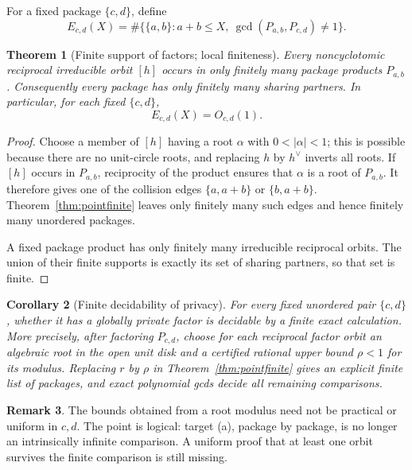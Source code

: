 \documentclass[11pt]{article}
\newtheorem{theorem}{Theorem}[section]
\newtheorem{corollary}[theorem]{Corollary}
\theoremstyle{definition}
\newtheorem{remark}[theorem]{Remark}
\begin{document}
For a fixed package \(\{c,d\}\), define
\[
 E_{c,d}(X)=\#\bigl\{\{a,b\}:a+b\leq X,
 \ \gcd(P_{a,b},P_{c,d})\neq1\bigr\}.
\]

\begin{theorem}[Finite support of factors; local finiteness]
\label{thm:localfinite}
Every noncyclotomic reciprocal irreducible orbit \([h]\) occurs in only
finitely many package products \(P_{a,b}\).  Consequently every package has
only finitely many sharing partners.  In particular, for each fixed
\(\{c,d\}\),
\[
 E_{c,d}(X)=O_{c,d}(1).
\]
\end{theorem}

\begin{proof}
Choose a member of \([h]\) having a root \(\alpha\) with
\(0<|\alpha|<1\); this is possible because there are no unit-circle roots,
and replacing \(h\) by \(h^\vee\) inverts all roots.  If \([h]\) occurs
in \(P_{a,b}\), reciprocity of the product ensures that \(\alpha\) is a
root of \(P_{a,b}\).  It therefore gives one of the collision edges
\(\{a,a+b\}\) or \(\{b,a+b\}\).  Theorem~\ref{thm:pointfinite} leaves
only finitely many such edges and hence finitely many unordered packages.

A fixed package product has only finitely many irreducible reciprocal orbits.
The union of their finite supports is exactly its set of sharing partners, so
that set is finite.
\end{proof}

\begin{corollary}[Finite decidability of privacy]
\label{cor:privacydecidable}
For every fixed unordered pair \(\{c,d\}\), whether it has a globally
private factor is decidable by a finite exact calculation.  More precisely,
after factoring \(P_{c,d}\), choose for each reciprocal factor orbit an
algebraic root in the open unit disk and a certified rational upper bound
\(\rho<1\) for its modulus.  Replacing \(r\) by \(\rho\) in
Theorem~\ref{thm:pointfinite} gives an explicit finite list of packages, and
exact polynomial gcds decide all remaining comparisons.
\end{corollary}

\begin{remark}
The bounds obtained from a root modulus need not be practical or uniform in
\(c,d\).  The point is logical: target (a), package by package, is no longer
an intrinsically infinite comparison.  A uniform proof that at least one
orbit survives the finite comparison is still missing.
\end{remark}
\end{document}

